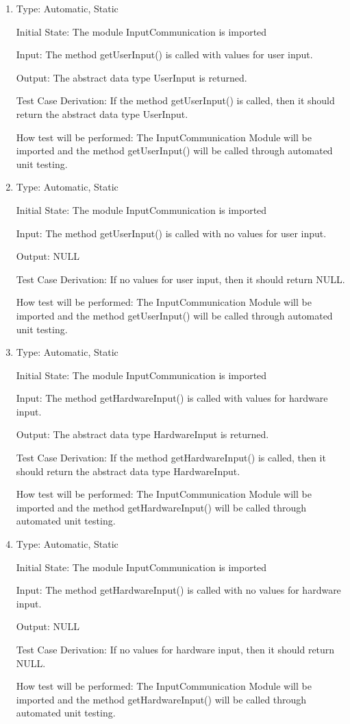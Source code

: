 \documentclass[12pt, titlepage]{article}
\begin{document}
\begin{enumerate}[{UT-IC}1.]

\item

Type: Automatic, Static
					
Initial State: The module InputCommunication is imported
					
Input: The method getUserInput() is called with values for user input.
					
Output: The abstract data type UserInput is returned.

Test Case Derivation: If the method getUserInput() is called, then it should return the abstract data type UserInput.

How test will be performed: The InputCommunication Module will be imported and the method getUserInput() will be called through automated unit testing.

\item

Type: Automatic, Static
					
Initial State: The module InputCommunication is imported
					
Input: The method getUserInput() is called with no values for user input.
					
Output: NULL

Test Case Derivation: If no values for user input, then it should return NULL.

How test will be performed: The InputCommunication Module will be imported and the method getUserInput() will be called through automated unit testing.

\item

Type: Automatic, Static
					
Initial State: The module InputCommunication is imported
					
Input: The method getHardwareInput() is called with values for hardware input.
					
Output: The abstract data type HardwareInput is returned.

Test Case Derivation: If the method getHardwareInput() is called, then it should return the abstract data type HardwareInput.

How test will be performed: The InputCommunication Module will be imported and the method getHardwareInput() will be called through automated unit testing.

\item

Type: Automatic, Static
					
Initial State: The module InputCommunication is imported
					
Input: The method getHardwareInput() is called with no values for hardware input.
					
Output: NULL

Test Case Derivation: If no values for hardware input, then it should return NULL.

How test will be performed: The InputCommunication Module will be imported and the method getHardwareInput() will be called through automated unit testing.

    
\end{enumerate}
\end{document}
